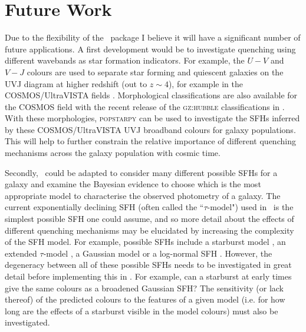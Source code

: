 \section{Future Work}\label{sec:future}

Due to the flexibility of the \starpy\ package I believe it will have a significant number of future applications. A first development would be to investigate quenching using different wavebands as star formation indicators. For example, the $U-V$ and $V-J$ colours are used to separate star forming and quiescent galaxies on the UVJ diagram \citep{labbe05, wuyts07, williams09, brammer11, patel12} at higher redshift (out to $z\sim4$), for example in the COSMOS/UltraVISTA fields \citep[e.g. see work by][]{muzzin13}. Morphological classifications are also available for the COSMOS field with the recent release of the \textsc{gz:hubble} classifications in \cite{willett16}. With these morphologies, \textsc{popstarpy} can be used to investigate the SFHs inferred by these COSMOS/UltraVISTA UVJ broadband colours for galaxy populations. This will help to further constrain the relative importance of different quenching mechanisms across the galaxy population with cosmic time. 

Secondly, \starpy\ could be adapted to consider many different possible SFHs for a galaxy and examine the Bayesian evidence to choose which is the most appropriate model to characterise the observed photometry of a galaxy. The current exponentially declining SFH (often called the ``$\tau$-model") used in \starpy\ is the simplest possible SFH one could assume, and so more detail about the effects of different quenching mechanisms may be elucidated by increasing the complexity of the SFH model. For example, possible SFHs include a starburst model \citep{kauffmann03}, an extended $\tau$-model \citep{simha14}, a Gaussian model \citep{feuillet16} or a log-normal SFH \citep{gladders13, abramson16}. However, the degeneracy between all of these possible SFHs needs to be investigated in great detail before implementing this in \starpy. For example, can a starburst at early times give the same colours as a broadened Gaussian SFH? The sensitivity (or lack thereof) of the predicted colours to the features of a given model (i.e. for how long are the effects of a starburst visible in the model colours) must also be investigated. 

